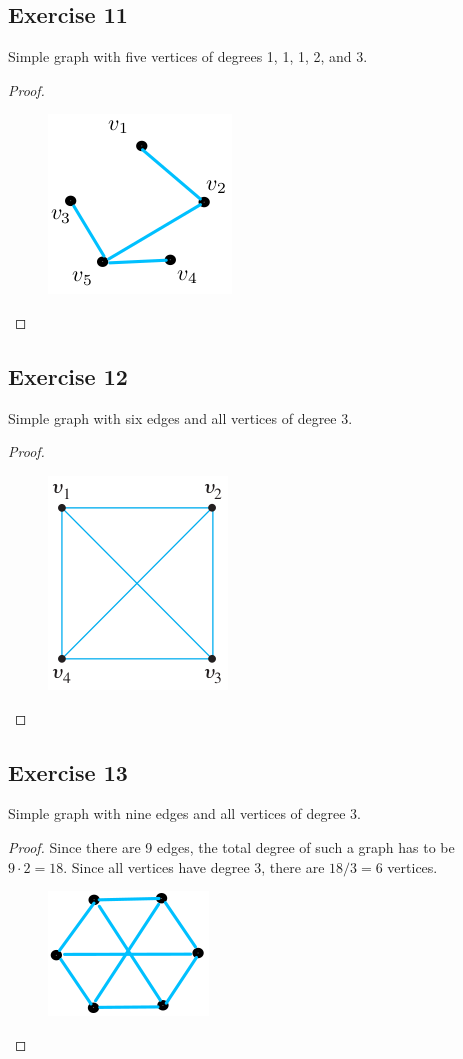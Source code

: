 \documentclass[14pt]{extarticle}
\begin{document}
\subsection{Exercise 11}
Simple graph with five vertices of degrees 1, 1, 1, 2, and 3.
\begin{proof}
\begin{figure}[ht!]
\centering
\includegraphics[scale=0.5]{../images/4.9.11.png}
\end{figure}
\end{proof}

\subsection{Exercise 12}
Simple graph with six edges and all vertices of degree 3.

\begin{proof}
\begin{figure}[ht!]
\centering
\includegraphics[scale=0.5]{../images/4.9.12.png}
\end{figure}
\end{proof}

\subsection{Exercise 13}
Simple graph with nine edges and all vertices of degree 3.

\begin{proof}
Since there are 9 edges, the total degree of such a graph has to be $9 \cdot 2 = 18$. Since all vertices have degree 3, there are $18 / 3 = 6$ vertices.
\begin{figure}[ht!]
\centering
\includegraphics[scale=0.5]{../images/4.9.13.png}
\end{figure}
\end{proof}
\end{document}

